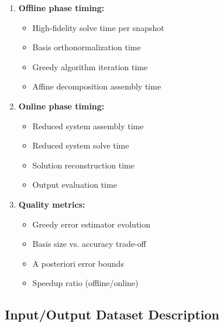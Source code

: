 \begin{enumerate}
\item \textbf{Offline phase timing:}
   \begin{itemize}
   \item High-fidelity solve time per snapshot
   \item Basis orthonormalization time
   \item Greedy algorithm iteration time
   \item Affine decomposition assembly time
   \end{itemize}

\item \textbf{Online phase timing:}
   \begin{itemize}
   \item Reduced system assembly time
   \item Reduced system solve time
   \item Solution reconstruction time
   \item Output evaluation time
   \end{itemize}

\item \textbf{Quality metrics:}
   \begin{itemize}
   \item Greedy error estimator evolution
   \item Basis size vs. accuracy trade-off
   \item A posteriori error bounds
   \item Speedup ratio (offline/online)
   \end{itemize}
\end{enumerate}



\subsection{Input/Output Dataset Description}


